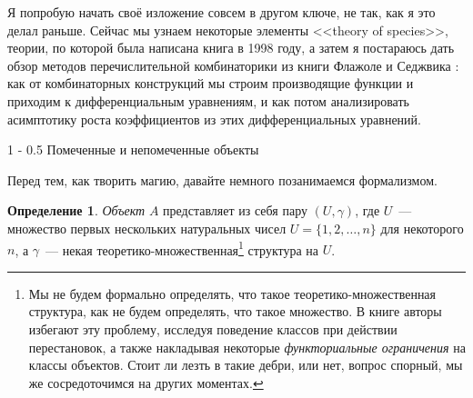 \documentclass{article}
\makeatletter
\theoremstyle{definition}
\newtheorem*{definition}{Определение}
\renewcommand{\section}{\@startsection
{section}%
{1}%
{\z@}%
{-\baselineskip}%
{0.5\baselineskip}%
{\centering\large\scshape}} %
\makeatother
\begin{document}
Я попробую начать своё изложение совсем в другом ключе, не так, как я это делал 
раньше. Сейчас мы узнаем некоторые элементы <<theory of species>>, теории, по 
которой была написана книга \cite{species} в 1998 году, а затем я постараюсь 
дать обзор методов перечислительной комбинаторики из книги Флажоле и Седжвика 
\cite{ac}: как от комбинаторных конструкций мы строим производящие функции и 
приходим к дифференциальным уравнениям, и как потом анализировать асимптотику 
роста коэффициентов из этих дифференциальных уравнений.

\section{Помеченные и непомеченные объекты}

Перед тем, как творить магию, давайте немного позанимаемся формализмом.

\begin{definition}
	\textit{Объект} \( A \) представляет из себя пару \( (U, \gamma) \), где \( 
	U \)~--- множество первых нескольких натуральных чисел \( U = \{1, 2, 
	\ldots, n\} \) для некоторого \( n \), а \( \gamma \)~--- некая 
	теоретико-множественная\footnote{Мы не будем формально определять, что 
	такое теоретико-множественная структура, как не будем определять, что такое 
	множество. В книге \cite{species} авторы избегают эту проблему, исследуя 
	поведение классов при действии перестановок, а также накладывая некоторые 
	\textit{функториальные ограничения} на классы объектов. Стоит ли лезть в 
	такие дебри, или нет, вопрос спорный, мы же сосредоточимся на других 
	моментах.} структура на \( U \).
\end{definition}
\end{document}
